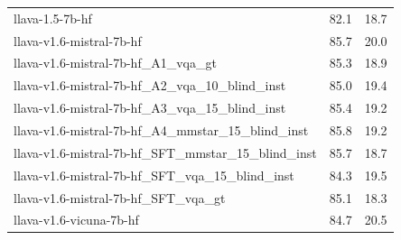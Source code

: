 \begin{tabular}{lrr}
llava-1.5-7b-hf & 82.1 & 18.7 \\
llava-v1.6-mistral-7b-hf & 85.7 & 20.0 \\
llava-v1.6-mistral-7b-hf_A1_vqa_gt & 85.3 & 18.9 \\
llava-v1.6-mistral-7b-hf_A2_vqa_10_blind_inst & 85.0 & 19.4 \\
llava-v1.6-mistral-7b-hf_A3_vqa_15_blind_inst & 85.4 & 19.2 \\
llava-v1.6-mistral-7b-hf_A4_mmstar_15_blind_inst & 85.8 & 19.2 \\
llava-v1.6-mistral-7b-hf_SFT_mmstar_15_blind_inst & 85.7 & 18.7 \\
llava-v1.6-mistral-7b-hf_SFT_vqa_15_blind_inst & 84.3 & 19.5 \\
llava-v1.6-mistral-7b-hf_SFT_vqa_gt & 85.1 & 18.3 \\
llava-v1.6-vicuna-7b-hf & 84.7 & 20.5 \\
\bottomrule
\end{tabular}
